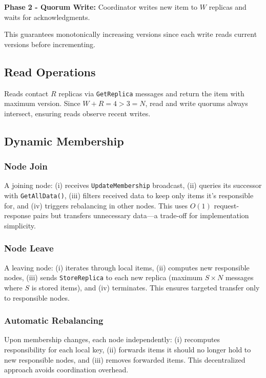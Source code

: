 \documentclass{article}
\begin{document}
\textbf{Phase 2 - Quorum Write:} Coordinator writes new item to $W$ replicas and waits for acknowledgments.

This guarantees monotonically increasing versions since each write reads current versions before incrementing.

\subsection{Read Operations}

Reads contact $R$ replicas via \texttt{GetReplica} messages and return the item with maximum version. Since $W + R = 4 > 3 = N$, read and write quorums always intersect, ensuring reads observe recent writes.

\subsection{Dynamic Membership}

\subsubsection{Node Join}
A joining node: (i) receives \texttt{UpdateMembership} broadcast, (ii) queries its successor with \texttt{GetAllData()}, (iii) filters received data to keep only items it's responsible for, and (iv) triggers rebalancing in other nodes. This uses $O(1)$ request-response pairs but transfers unnecessary data—a trade-off for implementation simplicity.

\subsubsection{Node Leave}
A leaving node: (i) iterates through local items, (ii) computes new responsible nodes, (iii) sends \texttt{StoreReplica} to each new replica (maximum $S \times N$ messages where $S$ is stored items), and (iv) terminates. This ensures targeted transfer only to responsible nodes.

\subsubsection{Automatic Rebalancing}
Upon membership changes, each node independently: (i) recomputes responsibility for each local key, (ii) forwards items it should no longer hold to new responsible nodes, and (iii) removes forwarded items. This decentralized approach avoids coordination overhead.
\end{document}
